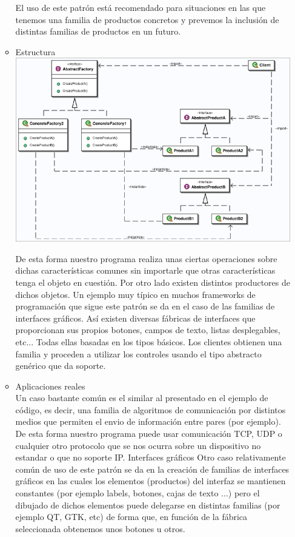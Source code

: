 \documentclass{article}
\begin{document}
\begin{enumerate}
\begin{itemize}
El uso de este patrón está recomendado para situaciones en las que tenemos una familia de productos concretos y prevemos la inclusión de distintas familias de productos en un futuro.

\item{Estructura}\\
\includegraphics[width=12cm]{abstract.png}

De esta forma nuestro programa realiza unas ciertas operaciones sobre dichas características comunes sin importarle que otras características tenga el objeto en cuestión. Por otro lado existen distintos productores de dichos objetos. Un ejemplo muy típico en muchos frameworks de programación que sigue este patrón se da en el caso de las familias de interfaces gráficos. Así existen diversas fábricas de interfaces que proporcionan sus propios botones, campos de texto, listas desplegables, etc... Todas ellas basadas en los tipos básicos. Los clientes obtienen una familia y proceden a utilizar los controles usando el tipo abstracto genérico que da soporte.

\item{Aplicaciones reales}\\
Un caso bastante común es el similar al presentado en el ejemplo de código, es decir, una familia de algoritmos de comunicación por distintos medios que permiten el envio de información entre pares (por ejemplo). De esta forma nuestro programa puede usar comunicación TCP, UDP o cualquier otro protocolo que se nos ocurra sobre un dispositivo no estandar o que no soporte IP.
Interfaces gráficos
Otro caso relativamente común de uso de este patrón se da en la creación de familias de interfaces gráficos en las cuales los elementos (productos) del interfaz se mantienen constantes (por ejemplo labels, botones, cajas de texto ...) pero el dibujado de dichos elementos puede delegarse en distintas familias (por ejemplo QT, GTK, etc) de forma que, en función de la fábrica seleccionada obtenemos unos botones u otros.



\end{itemize}
\end{enumerate}
\end{document}
